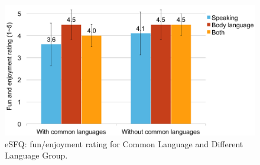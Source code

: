 \begin{figure}[!h]
\centering
\includegraphics[width=0.9\columnwidth]{Figures/US_Fun.pdf}
\caption{eSFQ: fun/enjoyment rating for Common Language and Different Language Group.}
\label{fig:US_Fun}
\end{figure}







